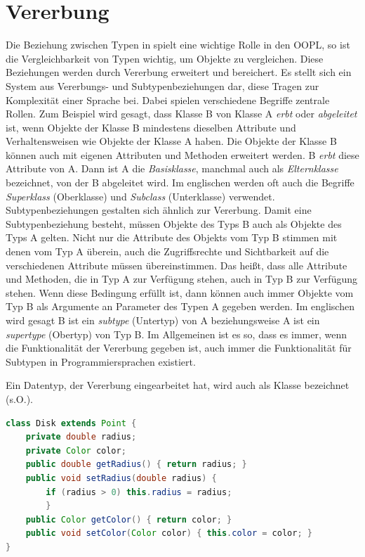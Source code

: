 \documentclass[
	12pt, %
	a4paper,
	listof=totoc, %
	bibliography=totoc, %
	numbers=noenddot, %
	ngerman, %
	headsepline, %
	oneside %
	]{scrbook} %
\begin{document}
\section{Vererbung}\label{sec:Vererbung}
Die Beziehung zwischen Typen in spielt eine wichtige Rolle in den \gls{OOPL}, so ist die Vergleichbarkeit von Typen wichtig, um Objekte zu vergleichen.  
Diese Beziehungen werden durch Vererbung erweitert und bereichert. Es stellt sich ein System aus Vererbungs- und Subtypenbeziehungen dar, diese Tragen zur Komplexität einer Sprache bei. Dabei spielen verschiedene Begriffe zentrale Rollen.  
Zum Beispiel wird gesagt, dass Klasse B von Klasse A \emph{erbt} oder \emph{abgeleitet} ist, wenn Objekte der Klasse B mindestens dieselben Attribute und Verhaltensweisen wie Objekte der Klasse A haben. Die Objekte der Klasse B können auch mit eigenen Attributen und Methoden erweitert werden.  
B \emph{erbt} diese Attribute von A. Dann ist A die \emph{Basisklasse}, manchmal auch als \emph{Elternklasse} bezeichnet, von der B abgeleitet wird.  
Im englischen werden oft auch die Begriffe \emph{Superklass} (Oberklasse) und \emph{Subclass} (Unterklasse) verwendet.  
Subtypenbeziehungen gestalten sich ähnlich zur Vererbung. Damit eine Subtypenbeziehung besteht, müssen Objekte des Typs B auch als Objekte des Typs A gelten. Nicht nur die Attribute des Objekts vom Typ B stimmen mit denen vom Typ A überein, auch die Zugriffsrechte und Sichtbarkeit auf die verschiedenen Attribute müssen übereinstimmen. Das heißt, dass alle Attribute und Methoden, die in Typ A zur Verfügung stehen, auch in Typ B zur Verfügung stehen.  
Wenn diese Bedingung erfüllt ist, dann können auch immer Objekte vom Typ B als Argumente an Parameter des Typen A gegeben werden. Im englischen wird gesagt B ist ein \emph{subtype} (Untertyp) von A beziehungsweise A ist ein \emph{supertype} (Obertyp) von Typ B. Im Allgemeinen ist es so, dass es immer, wenn die Funktionalität der Vererbung gegeben ist, auch immer die Funktionalität für Subtypen in Programmiersprachen existiert.  
  
Ein Datentyp, der Vererbung eingearbeitet hat, wird auch als Klasse bezeichnet (s.O.).

\begin{lstlisting}[language=Java, caption=Erweiterung der Point Klasse aus Listing \ref{lst:Java-Operation} \cite{OOPL}, label={lst:Vererbung}]
class Disk extends Point {
	private double radius;
	private Color color;
	public double getRadius() { return radius; }
	public void setRadius(double radius) {
		if (radius > 0) this.radius = radius;
		}
	public Color getColor() { return color; }
	public void setColor(Color color) { this.color = color; }
}
\end{lstlisting}
\end{document}
